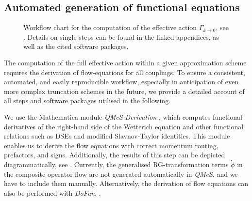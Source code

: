\documentclass[aps,twocolumn,prd,superscriptaddress]{revtex4-2}
\begin{document}
\subsection{Automated generation of functional equations}
\label{sec:automatedGen}
%
\begin{figure}
	\vspace{1mm}
	\caption{Workflow chart for the computation of the effective action $\Gamma_{k \to 0}$, see . Details on single steps can be found in the linked appendices, as well as the cited software packages. \hspace*{\fill}}
	\label{fig:workflow}
\end{figure}
%

The computation of the full effective action within a given approximation scheme  requires the derivation of flow-equations for all couplings. To ensure a consistent, automated, and easily reproducible workflow, especially in anticipation of even more complex truncation schemes in the future, we provide a detailed account of all steps and software packages utilised in the following. 

We use the Mathematica module \textit{QMeS-Derivation} \cite{Pawlowski:2021tkk}, which computes functional derivatives of the right-hand side of the Wetterich equation \cite{Wetterich:1992yh} and other functional relations such as DSEs and modified Slavnov-Taylor identities. This module enables us to derive the flow equations with correct momentum routing, prefactors, and signs. Additionally, the results of this step can be depicted diagrammatically, see . Currently, the generalised RG-transformation terms $\dot \phi$ in the composite operator flow  are not generated automatically in \textit{QMeS}, and we have to include them manually. 
Alternatively, the derivation of flow equations can also be performed with \textit{DoFun}, \cite{Huber:2011qr,Huber:2019dkb}. 
\end{document}
